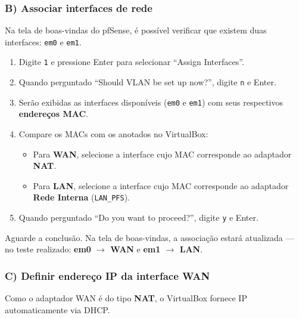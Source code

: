 
\subsubsection*{B) Associar interfaces de rede}

Na tela de boas-vindas do pfSense, é possível verificar que existem duas interfaces: \texttt{em0} e \texttt{em1}.


\begin{enumerate}
  \item Digite \texttt{1} e pressione Enter para selecionar ``Assign Interfaces''.
  \item Quando perguntado ``Should VLAN be set up now?'', digite \texttt{n} e Enter.
  \item Serão exibidas as interfaces disponíveis (\texttt{em0} e \texttt{em1}) com seus respectivos \textbf{endereços MAC}.
  \item Compare os MACs com os anotados no VirtualBox:
  \begin{itemize}
    \item Para \textbf{WAN}, selecione a interface cujo MAC corresponde ao adaptador \textbf{NAT}.
    \item Para \textbf{LAN}, selecione a interface cujo MAC corresponde ao adaptador \textbf{Rede Interna} (\texttt{LAN\_PFS}).
  \end{itemize}
  \item Quando perguntado ``Do you want to proceed?'', digite \texttt{y} e Enter.
\end{enumerate}


Aguarde a conclusão. Na tela de boas-vindas, a associação estará atualizada --- no teste realizado: \textbf{em0 $\rightarrow$ WAN} e \textbf{em1 $\rightarrow$ LAN}.

\subsubsection*{C) Definir endereço IP da interface WAN}

Como o adaptador WAN é do tipo \textbf{NAT}, o VirtualBox fornece IP automaticamente via DHCP.

